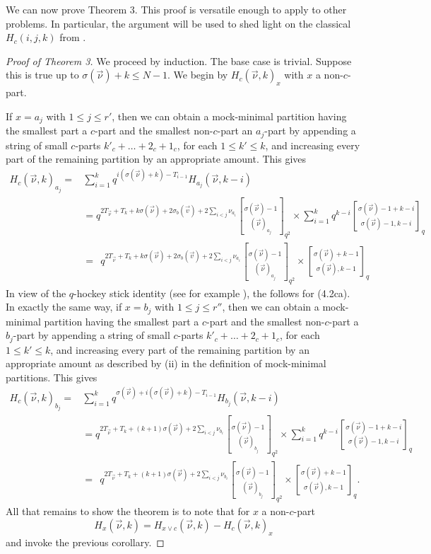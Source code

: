 \documentclass[12pt,a4paper]{amsart}
\theoremstyle{definition}
\theoremstyle{notation}
\theoremstyle{corollary}
\begin{document}
We can now prove Theorem $3$. This proof is versatile enough to apply to other problems. In particular, the argument will be used to shed light on the classical $H_c(i,j,k)$ from \cite{KAGEABG95}. 


\begin{proof}[Proof of Theorem 3]
We proceed by induction. The base case is trivial. Suppose this is true up to $\sigma(\vec{\nu})+k\leq N-1$. We begin by $H_c(\vec{\nu},k)_x$ with $x$ a non-$c$-part.\medskip

If $x=a_j$ with $1\leq j\leq r'$, then we can obtain a mock-minimal partition having the smallest part a $c$-part and the smallest non-$c$-part an $a_j$-part by appending a string of small $c$-parts $k'_c+\dots+2_c+1_c$, for each $1\leq k'\leq k$, and increasing every part of the remaining partition by an appropriate amount. This gives   
\begin{align*}
    H_c(\vec{\nu},k)_{a_j}=&\sum_{i=1}^k q^{i(\sigma(\vec{\nu})+k)-T_{i-1}}H_{a_j}(\vec{\nu},k-i)\\&=q^{2T_{\vec{\nu}}+T_k+k\sigma(\vec{\nu})+2\sigma_b(\vec{v})+2\sum_{i<j}\nu_{a_i}}{\sigma(\vec{\nu})-1\brack (\vec{\nu})_{a_j}}_{q^2}\times \sum_{i=1}^kq^{k-i}{\sigma(\vec{\nu})-1+k-i\brack \sigma(\vec{\nu})-1,k-i}_{q}\\
    &=\:\:q^{2T_{\vec{\nu}}+T_k+k\sigma(\vec{\nu})+2\sigma_b(\vec{v})+2\sum_{i<j}\nu_{a_i}}{\sigma(\vec{\nu})-1\brack (\vec{\nu})_{a_j}}_{q^2}\times {\sigma(\vec{\nu})+k-1\brack \sigma(\vec{\nu}),k-1}_{q}
\end{align*}
In view of the $q$-hockey stick identity (see for example \cite[Thm.~3.4]{GEA}), the follows for (4.2ca).\\  

In exactly the same way, if $x=b_j$ with $1\leq j\leq r''$, then we can obtain a mock-minimal partition having the smallest part a $c$-part and the smallest non-$c$-part a $b_j$-part by appending a string of small $c$-parts $k'_c+\dots+2_c+1_c$, for each $1\leq k'\leq k$, and increasing every part of the remaining partition by an appropriate amount as described by (ii) in the definition of mock-minimal partitions. This gives \[\] 
\begin{align*}
    H_c(\vec{\nu},k)_{b_j}=&\sum_{i=1}^k q^{\sigma(\vec{\nu})+i(\sigma(\vec{\nu})+k)-T_{i-1}}H_{b_j}(\vec{\nu},k-i)\\&=q^{2T_{\vec{\nu}}+T_k+(k+1)\sigma(\vec{\nu})+2\sum_{i<j}\nu_{b_i}}{\sigma(\vec{\nu})-1\brack (\vec{\nu})_{b_j}}_{q^2}\times \sum_{i=1}^kq^{k-i}{\sigma(\vec{\nu})-1+k-i\brack \sigma(\vec{\nu})-1,k-i}_{q}\\
    &=\:\:q^{2T_{\vec{\nu}}+T_k+(k+1)\sigma(\vec{\nu})+2\sum_{i<j}\nu_{b_i}}{\sigma(\vec{\nu})-1\brack (\vec{\nu})_{b_j}}_{q^2}\times {\sigma(\vec{\nu})+k-1\brack \sigma(\vec{\nu}),k-1}_{q}.
\end{align*}
All that remains to show the theorem is to note that for $x$ a non-$c$-part \[H_x(\vec{\nu},k)=H_{x\lor c}(\vec{\nu},k)-H_{c}(\vec{\nu},k)_x\]
and invoke the previous corollary.
\end{proof}
\end{document}

